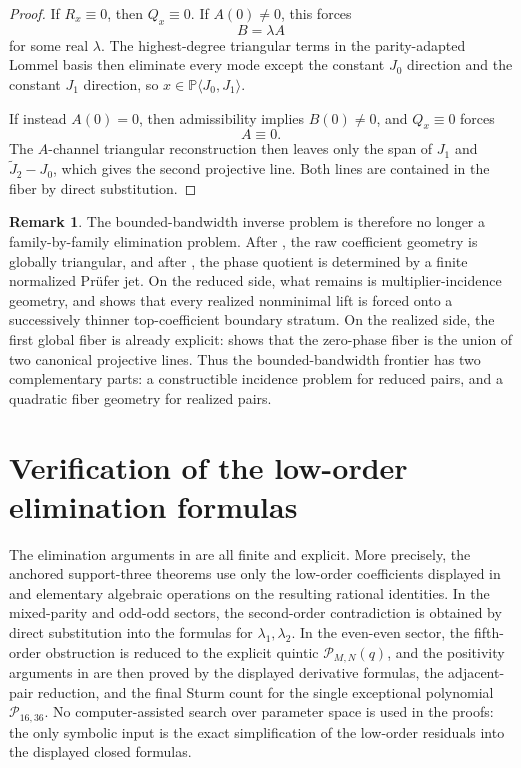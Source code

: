 \documentclass[11pt,reqno]{amsart}
\theoremstyle{definition}
\newtheorem{remark}[theorem]{Remark}
\newcommand{\PP}{\mathbb{P}}
\begin{document}
\begin{proof}
If $R_x\equiv 0$, then $Q_x\equiv 0$. If $A(0)\neq 0$, this forces
\[
B=\lambda A
\]
for some real $\lambda$. The highest-degree triangular terms in the parity-adapted Lommel basis
then eliminate every mode except the constant $J_0$ direction and the constant $J_1$ direction,
so $x\in \PP\langle J_0,J_1\rangle$.

If instead $A(0)=0$, then admissibility implies $B(0)\neq 0$, and $Q_x\equiv 0$ forces
\[
A\equiv 0.
\]
The $A$-channel triangular reconstruction then leaves only the span of $J_1$ and
$\widetilde J_2-J_0$, which gives the second projective line. Both lines are contained in the
fiber by direct substitution.
\end{proof}

\begin{remark}
The bounded-bandwidth inverse problem is therefore no longer a family-by-family elimination
problem. After , the raw
coefficient geometry is globally triangular, and after , the
phase quotient is determined by a finite normalized Pr\"ufer jet. On the reduced side, what
remains is multiplier-incidence geometry, and  shows that every
realized nonminimal lift is forced onto a successively thinner top-coefficient boundary stratum.
On the realized side, the first global fiber is already explicit:
 shows that the zero-phase fiber is the union of two canonical
projective lines. Thus the bounded-bandwidth frontier has two complementary parts: a
constructible incidence problem for reduced pairs, and a quadratic fiber geometry for realized
pairs.
\end{remark}

\appendix

\section{Verification of the low-order elimination formulas}

The elimination arguments in  are all finite and explicit. More precisely,
the anchored support-three theorems use only the low-order coefficients displayed in
 and elementary algebraic
operations on the resulting rational identities. In the mixed-parity and odd-odd sectors, the
second-order contradiction is obtained by direct substitution into the formulas for
$\lambda_1,\lambda_2$. In the even-even sector, the fifth-order obstruction is reduced to the
explicit quintic $\mathcal P_{M,N}(q)$, and the positivity arguments in
 are then proved by the displayed derivative formulas, the
adjacent-pair reduction, and the final Sturm count for the single exceptional polynomial
$\mathcal P_{16,36}$. No computer-assisted search over parameter space is used in the proofs:
the only symbolic input is the exact simplification of the low-order residuals into the
displayed closed formulas.
\end{document}
